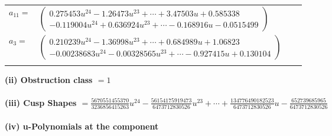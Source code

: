 \documentclass[1p]{elsarticle_modified}
\theoremstyle{definition}
\begin{document}
\begin{tabular}{m{7pt} m{180pt} m{7pt} m{180pt} }
\flushright $a_{11}=$&$\begin{pmatrix}0.275453 u^{24}-1.26473 u^{23}+\cdots+3.47503 u+0.585338\\-0.119004 u^{24}+0.636924 u^{23}+\cdots-0.168916 u-0.0515499\end{pmatrix}$ \\
\flushright $a_{3}=$&$\begin{pmatrix}0.210239 u^{24}-1.36998 u^{23}+\cdots+0.684989 u+1.06823\\-0.00238683 u^{24}-0.00328565 u^{23}+\cdots-0.927415 u+0.130104\end{pmatrix}$\\&\end{tabular}
\flushleft \textbf{(ii) Obstruction class $= 1$}\\~\\
\flushleft \textbf{(iii) Cusp Shapes $= \frac{5670551455370}{3236856415263} u^{24}-\frac{56154175919473}{6473712830526} u^{23}+\cdots+\frac{134776490182523}{6473712830526} u-\frac{652739685965}{6473712830526}$}\\~\\
\newpage\renewcommand{\arraystretch}{1}
\flushleft \textbf{(iv) u-Polynomials at the component}\newline \\
\end{document}

